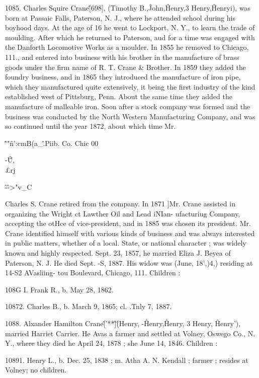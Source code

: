 \documentclass{book}
\begin{document}
1085. Charles Squire Crane\^ [698], (Timothy B.,\^ John,\^ 
Henry,3 Henry,\^ Henryi), was born at Passaic Falls, Paterson, 
N. J., where he attended school during his boyhood days. At 
the age of 16 he went to Lockport, N. Y., to learn the trade of 
moulding. After which he returned to Paterson, aud for a time 
was engaged with the Danforth Locomotive Works as a moulder. 
In 1855 he removed to Chicago, 111., and entered into business 
with his brother in the manufacture of brass goods under the firm 
name of R. T. Crane \& Brother. In 1859 they added the foundry 
business, and in 1865 they introduced the manufacture of iron 
pipe, which they manufactured quite extensively, it being the 
first industry of the kind established west of Pittsburg, Penn. 
About the same time they added the manufacture of malleable 
iron. Soon after a stock company was formed and the business 
was conducted by the North Western Manufacturing Company, 
and was so continued until the year 1872, about which time Mr. 




\^'"\^n':cmB(a\_\^.Piib. Co. Chic 00  



-\^\^ U, \\£rj 



\^-\^->"v\_C 




Charles S. Crane retired from the company. In 1871 ]Mr. Crane 
assisted in organizing the Wright ct Lawther Oil and Lead iNIan- 
ufacturiug Company, accepting the otHce of vice-president, and 
in 1885 was chosen its president. Mr. Crane identified himself 
with various kinds of business and was always interested in 
public matters, whether of a local. State, or national character ; 
was widely known and highly respected. Sept. 23, 1857, he 
married Eliza J. Beyea of Paterson, N. J. He died Sept. -S, 
1887. His widow was (June, 18',)4,) residing at 14-S2 AVasliing- 
tou Boulevard, Chicago, 111. Children : 

108G I. Frank R., b. May 28, 1862. 

10872. Charles B., b. March 9, 1865; cl. .Tnly 7, 1887. 

1088. Alxander Hamilton Crane\^ ['**\^]\^ (Henry, -\^ Henry,\^ 
Henry, 3 Henry, \^ Henry'), married Harriet Carrier. He Avas a 
farmer and settled at Volney, Oswego Co., N. Y., where they 
died he April 24, 1878 ; she June 14, 1846. Children : 

10891. Henry L., b. Dec. 25, 1838 ; m. Atha A. N. Kendall ; farmer ; 
resides at Volney; no children. 
\end{document}

